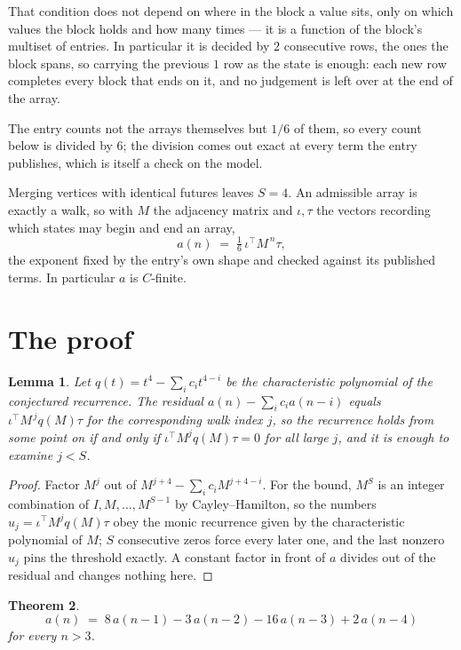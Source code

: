 \documentclass[11pt,a4paper]{article}
\theoremstyle{plain}
\newtheorem{theorem}{Theorem}
\newtheorem{lemma}[theorem]{Lemma}
\theoremstyle{definition}
\begin{document}
That condition does not depend on where in the block a value sits, only on which values the block holds and how many times --- it is a function of the block's multiset of entries. In particular it is decided by $2$ consecutive rows, the ones the block spans, so carrying the previous $1$ row as the state is enough: each new row completes every block that ends on it, and no judgement is left over at the end of the array.

The entry counts not the arrays themselves but $1/6$ of them, so every count below is divided by $6$; the division comes out exact at every term the entry publishes, which is itself a check on the model.

Merging vertices with identical futures leaves $S=4$. An admissible array is exactly a walk, so with $M$ the adjacency matrix and $\iota,\tau$ the vectors recording which states may begin and end an array,
\[
a(n)\;=\;\tfrac{1}{6}\,\iota^{\!\top}M^{\,n}\tau ,
\]
the exponent fixed by the entry's own shape and checked against its published terms. In
particular $a$ is $C$-finite.

\section{The proof}

\begin{lemma}\label{lem:crit}
Let $q(t)=t^{4}-\sum_i c_it^{4-i}$ be the characteristic polynomial of the
conjectured recurrence. The residual $a(n)-\sum_ic_ia(n-i)$ equals
$\iota^{\!\top}M^{\,j}q(M)\tau$ for the corresponding walk index $j$, so the recurrence
holds from some point on if and only if $\iota^{\!\top}M^{j}q(M)\tau=0$ for all large $j$,
and it is enough to examine $j<S$.
\end{lemma}

\begin{proof}
Factor $M^{j}$ out of $M^{j+4}-\sum_ic_iM^{j+4-i}$. For the bound, $M^{S}$
is an integer combination of $I,M,\dots,M^{S-1}$ by Cayley--Hamilton, so the numbers
$u_j=\iota^{\!\top}M^{j}q(M)\tau$ obey the monic recurrence given by the characteristic
polynomial of $M$; $S$ consecutive zeros force every later one, and the last nonzero $u_j$
pins the threshold exactly. A constant factor in front of $a$ divides out of the residual and
changes nothing here.
\end{proof}

\begin{theorem}
\[
a(n)\;=\;8\,a(n-1) - 3\,a(n-2) - 16\,a(n-3) + 2\,a(n-4)
\]
for every $n>3$.
\end{theorem}
\end{document}
